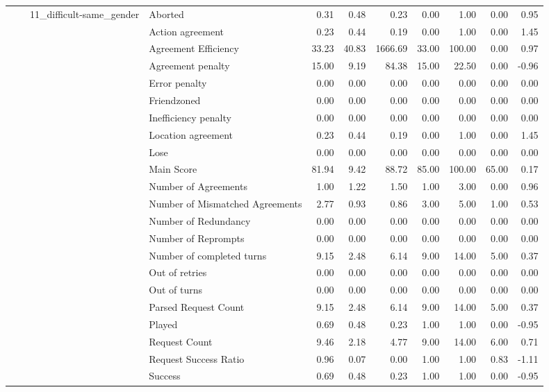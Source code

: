 \begin{tabular}{llllrrrrrrr}
\cline{3-11}
 &  & \multirow[t]{27}{*}{11_difficult-same_gender} & Aborted & 0.31 & 0.48 & 0.23 & 0.00 & 1.00 & 0.00 & 0.95 \\
 &  &  & Action agreement & 0.23 & 0.44 & 0.19 & 0.00 & 1.00 & 0.00 & 1.45 \\
 &  &  & Agreement Efficiency & 33.23 & 40.83 & 1666.69 & 33.00 & 100.00 & 0.00 & 0.97 \\
 &  &  & Agreement penalty & 15.00 & 9.19 & 84.38 & 15.00 & 22.50 & 0.00 & -0.96 \\
 &  &  & Error penalty & 0.00 & 0.00 & 0.00 & 0.00 & 0.00 & 0.00 & 0.00 \\
 &  &  & Friendzoned & 0.00 & 0.00 & 0.00 & 0.00 & 0.00 & 0.00 & 0.00 \\
 &  &  & Inefficiency penalty & 0.00 & 0.00 & 0.00 & 0.00 & 0.00 & 0.00 & 0.00 \\
 &  &  & Location agreement & 0.23 & 0.44 & 0.19 & 0.00 & 1.00 & 0.00 & 1.45 \\
 &  &  & Lose & 0.00 & 0.00 & 0.00 & 0.00 & 0.00 & 0.00 & 0.00 \\
 &  &  & Main Score & 81.94 & 9.42 & 88.72 & 85.00 & 100.00 & 65.00 & 0.17 \\
 &  &  & Number of Agreements & 1.00 & 1.22 & 1.50 & 1.00 & 3.00 & 0.00 & 0.96 \\
 &  &  & Number of Mismatched Agreements & 2.77 & 0.93 & 0.86 & 3.00 & 5.00 & 1.00 & 0.53 \\
 &  &  & Number of Redundancy & 0.00 & 0.00 & 0.00 & 0.00 & 0.00 & 0.00 & 0.00 \\
 &  &  & Number of Reprompts & 0.00 & 0.00 & 0.00 & 0.00 & 0.00 & 0.00 & 0.00 \\
 &  &  & Number of completed turns & 9.15 & 2.48 & 6.14 & 9.00 & 14.00 & 5.00 & 0.37 \\
 &  &  & Out of retries & 0.00 & 0.00 & 0.00 & 0.00 & 0.00 & 0.00 & 0.00 \\
 &  &  & Out of turns & 0.00 & 0.00 & 0.00 & 0.00 & 0.00 & 0.00 & 0.00 \\
 &  &  & Parsed Request Count & 9.15 & 2.48 & 6.14 & 9.00 & 14.00 & 5.00 & 0.37 \\
 &  &  & Played & 0.69 & 0.48 & 0.23 & 1.00 & 1.00 & 0.00 & -0.95 \\
 &  &  & Request Count & 9.46 & 2.18 & 4.77 & 9.00 & 14.00 & 6.00 & 0.71 \\
 &  &  & Request Success Ratio & 0.96 & 0.07 & 0.00 & 1.00 & 1.00 & 0.83 & -1.11 \\
 &  &  & Success & 0.69 & 0.48 & 0.23 & 1.00 & 1.00 & 0.00 & -0.95 \\

\end{tabular}
